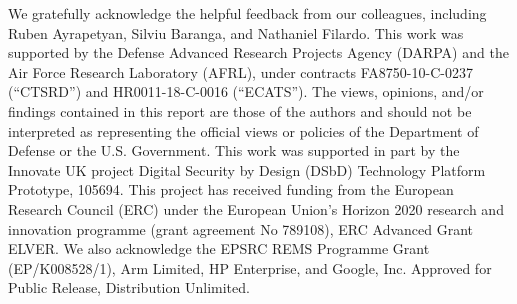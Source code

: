 \documentclass[12pt,twoside,openright,a4paper]{article}
\begin{document}
We gratefully acknowledge the helpful feedback from our colleagues, including
Ruben Ayrapetyan, Silviu Baranga, and Nathaniel Filardo.
This work was supported by the Defense Advanced Research Projects Agency (DARPA) and the Air Force Research Laboratory (AFRL), under contracts
FA8750-10-C-0237 (``CTSRD'') and HR0011-18-C-0016 (``ECATS'').
The views, opinions, and/or findings contained in this report are those of the authors and should not be interpreted as representing the official views or policies of the Department of Defense or the U.S. Government.
This work was supported in part by the Innovate UK project Digital Security by
Design (DSbD) Technology Platform Prototype, 105694.
This project has received funding from the European Research Council
(ERC) under the European Union’s Horizon 2020 research and innovation programme (grant agreement No 789108), ERC Advanced Grant ELVER.
We also acknowledge the EPSRC REMS Programme Grant (EP/K008528/1), Arm Limited,
HP Enterprise, and Google, Inc.
Approved for Public Release, Distribution Unlimited.

\printbibliography
\end{document}
